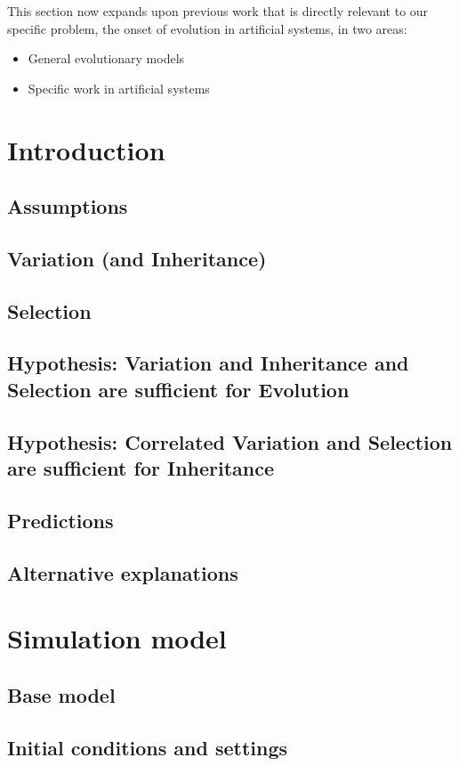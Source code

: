 \documentclass[]{report}
\begin{document}
This section now expands upon previous work that is directly relevant to our specific problem, the onset of evolution in artificial systems, in two areas:

\begin{itemize}
	\item General evolutionary models
	\item Specific work in artificial systems
\end{itemize}

\chapter{Introduction}
\section{Assumptions}
\section{Variation (and Inheritance)}
\section{Selection}
\section{Hypothesis: Variation and Inheritance and Selection are sufficient for Evolution}
\section{Hypothesis: Correlated Variation and Selection are sufficient for Inheritance}
\section{Predictions}
\section{Alternative explanations}

\chapter{Simulation model}
\section{Base model}
\section{Initial conditions and settings}
\end{document}
